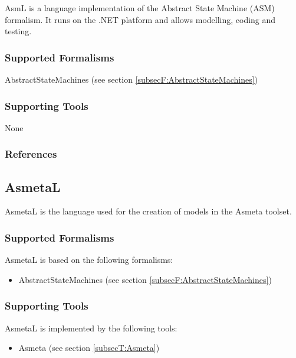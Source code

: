 
AsmL is a language implementation of the Abstract State Machine (ASM) formalism.
It runs on the .NET platform and allows modelling, coding and testing.

\subsubsection{Supported Formalisms}
	\item AbstractStateMachines (see section \ref{subsecF:AbstractStateMachines})

\subsubsection{Supporting Tools}

None


\subsubsection{References}





\subsection{AsmetaL}
\label{subsecL:AsmetaL}

AsmetaL is the language used for the creation of models in the Asmeta toolset.

\subsubsection{Supported Formalisms}

AsmetaL is based on the following formalisms:
\begin{itemize}
	\item AbstractStateMachines (see section \ref{subsecF:AbstractStateMachines})
\end{itemize}


\subsubsection{Supporting Tools}

AsmetaL is implemented by the following tools:
\begin{itemize}
	\item Asmeta (see section \ref{subsecT:Asmeta})
\end{itemize}


